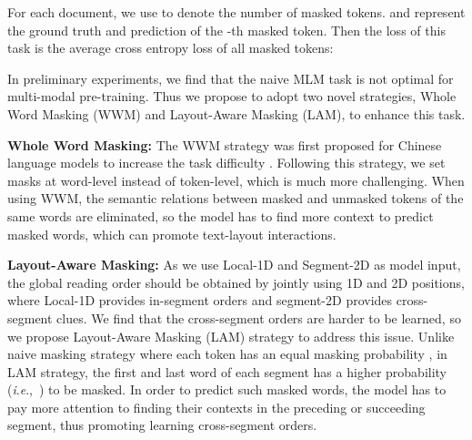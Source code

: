 \documentclass[11pt]{article}
\newcommand{\ie}{\textit{i}.\textit{e}.,\ }
\begin{document}
For each document,  we use  to denote the number of masked tokens.   and  represent the ground truth and prediction of the -th masked token. Then the loss of this task is the average cross entropy loss of all masked tokens:


In preliminary experiments, we find that the naive MLM  task is not optimal for multi-modal pre-training.
Thus we propose to adopt two novel strategies, Whole Word Masking (WWM) and Layout-Aware Masking (LAM), to enhance this task.
  
\noindent\textbf{Whole Word Masking:}
The WWM strategy was first proposed for Chinese language models to increase the task difficulty \citep{cui2021pre}.
Following this strategy,  we set masks at word-level instead of token-level, which is much more challenging.
When using WWM, the semantic relations between masked and unmasked tokens of the same words are eliminated, so the model has to find more context to predict masked words, which can promote text-layout interactions.  

\noindent\textbf{Layout-Aware Masking:}
As we use Local-1D and Segment-2D as model input, the global reading order should be obtained by jointly using 1D and 2D positions, where Local-1D provides in-segment orders and segment-2D provides cross-segment clues.
We find that the cross-segment orders are harder to be learned, so we propose Layout-Aware Masking (LAM) strategy to address this issue.
Unlike naive masking strategy where each token has an equal masking probability ,  in LAM strategy, the first and last word of each segment has a higher probability (\ie ) to be masked. 
In order to predict such masked words, the model has to pay more attention to finding their contexts in the preceding or succeeding segment, thus promoting learning cross-segment orders.   
\end{document}
